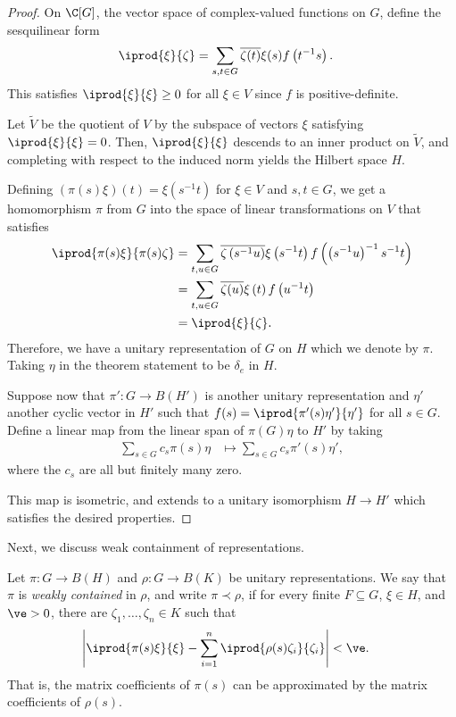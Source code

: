 \documentclass[10pt]{mypackage}
\begin{document}
\begin{proof}
  On $\C[G]$, the vector space of complex-valued functions on $G$, define the sesquilinear form
  \begin{align*}
    \iprod{\xi}{\zeta} &= \sum_{s,t\in G} \overline{\zeta(t)} \xi(s) f\left( t^{-1}s \right).
  \end{align*}
  This satisfies $ \iprod{\xi}{\xi} \geq 0 $ for all $\xi\in V$ since $f$ is positive-definite.

  Let $ \widetilde{V} $ be the quotient of $V$ by the subspace of vectors $\xi$ satisfying $ \iprod{\xi}{\xi} = 0 $. Then, $ \iprod{\xi}{\xi} $ descends to an inner product on $ \widetilde{V} $, and completing with respect to the induced norm yields the Hilbert space $H$.

  Defining $\left( \pi(s)\xi \right)(t) = \xi\left( s^{-1}t \right)$ for $\xi\in V$ and $s,t\in G$, we get a homomorphism $\pi$ from $G$ into the space of linear transformations on $V$ that satisfies
  \begin{align*}
    \iprod{\pi(s)\xi}{\pi(s)\zeta} &= \sum_{t,u\in G} \overline{\zeta\left( s^{-1}u \right)}\xi\left( s^{-1}t \right)f\left( \left( s^{-1}u \right)^{-1}s^{-1}t \right)\\
                                  &= \sum_{t,u\in G} \overline{\zeta(u)} \xi\left( t \right) f\left( u^{-1}t \right)\\
                                  &= \iprod{\xi}{\zeta}.
  \end{align*}
  Therefore, we have a unitary representation of $G$ on $H$ which we denote by $\pi$. Taking $\eta$ in the theorem statement to be $\delta_e$ in $H$.

  Suppose now that $\pi'\colon G\rightarrow B\left( H' \right)$ is another unitary representation and $\eta'$ another cyclic vector in $H'$ such that $f(s) = \iprod{\pi'(s)\eta'}{\eta'}$ for all $s\in G$. Define a linear map from the linear span of $\pi(G)\eta$ to $H'$ by taking
  \begin{align*}
    \sum_{s\in G} c_s\pi(s)\eta &\mapsto \sum_{s\in G} c_s\pi'(s)\eta',
  \end{align*}
  where the $c_s$ are all but finitely many zero.

  This map is isometric, and extends to a unitary isomorphism $H\rightarrow H'$ which satisfies the desired properties.
\end{proof}
Next, we discuss weak containment of representations.
\begin{definition}
  Let $\pi\colon G\rightarrow B\left( H \right)$ and $\rho\colon G\rightarrow B\left( K \right)$ be unitary representations. We say that $\pi$ is \textit{weakly contained} in $\rho$, and write $ \pi\prec \rho $, if for every finite $F\subseteq G$, $\xi\in H$, and $\ve > 0$, there are $\zeta_1,\dots,\zeta_n\in K$ such that
  \begin{align*}
    \left\vert \iprod{\pi(s)\xi}{\xi} - \sum_{i=1}^{n} \iprod{\rho(s)\zeta_i}{\zeta_i} \right\vert &< \ve.
  \end{align*}
  That is, the matrix coefficients of $\pi(s)$ can be approximated by the matrix coefficients of $\rho(s)$.
\end{definition}
\end{document}
